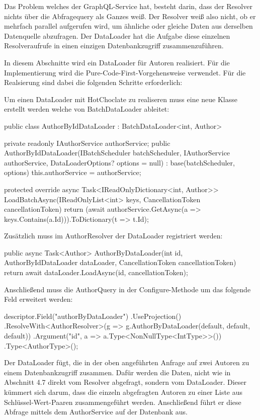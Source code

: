 Das Problem welches der GraphQL-Service hat, besteht darin, dass der Resolver nichts über die Abfragequery als Ganzes weiß.
Der Resolver weiß also nicht, ob er mehrfach parallel aufgerufen wird, um ähnliche oder gleiche Daten aus derselben Datenquelle abzufragen.
Der DataLoader hat die Aufgabe diese einzelnen Resolveraufrufe in einen einzigen Datenbankzugriff zusammenzuführen.

In diesem Abschnitte wird ein DataLoader für Autoren realisiert.
Für die Implementierung wird die Pure-Code-First-Vorgehensweise verwendet.
Für die Realsierung sind dabei die folgenden Schritte erforderlich:
\newline

Um einen DataLoader mit HotChoclate zu realiseren muss eine neue Klasse erstellt werden welche von BatchDataLoader ableitet:
\begin{JsCode}
public class AuthorByIdDataLoader : BatchDataLoader<int, Author> {
    private readonly IAuthorService authorService;
    public AuthorByIdDataLoader(IBatchScheduler batchScheduler, IAuthorService authorService, DataLoaderOptions? options = null) : base(batchScheduler, options) {
        this.authorService = authorService;
    }

    protected override async Task<IReadOnlyDictionary<int, Author>> LoadBatchAsync(IReadOnlyList<int> keys, CancellationToken cancellationToken) {
        return (await authorService.GetAsync(a => keys.Contains(a.Id))).ToDictionary(t => t.Id);
    }
}
\end{JsCode}

Zusätzlich muss im AuthorResolver der DataLoader registriert werden:
\begin{JsCode}
public async Task<Author> AuthorByDataLoader(int id, AuthorByIdDataLoader dataLoader, CancellationToken cancellationToken) {
    return await dataLoader.LoadAsync(id, cancellationToken);
}
\end{JsCode}

Anschließend muss die AuthorQuery in der Configure-Methode um das folgende Feld erweitert werden:
\begin{JsCode}
descriptor.Field("authorByDataLoader")
    .UseProjection()
    .ResolveWith<AuthorResolver>(g => g.AuthorByDataLoader(default, default, default))
    .Argument("id", a => a.Type<NonNullType<IntType>>())
    .Type<AuthorType>();
\end{JsCode}

Der DataLoader fügt, die in der oben angeführten Anfrage auf zwei Autoren zu einem Datenbankzugriff zusammen.
Dafür werden die Daten, nicht wie in Abschnitt 4.7 direkt vom Resolver abgefragt, sondern vom DataLoader.
Dieser kümmert sich darum, dass die einzeln abgefragten Autoren zu einer Liste aus Schlüssel-Wert-Paaren zusammengeführt werden.
Anschließend führt er diese Abfrage mittels dem AuthorService auf der Datenbank aus.
\newline

